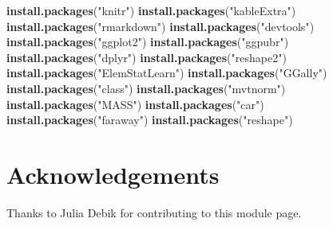 \documentclass[]{article}
\newenvironment{Shaded}{\begin{snugshade}}{\end{snugshade}}
\newcommand{\KeywordTok}[1]{\textcolor[rgb]{0.13,0.29,0.53}{\textbf{#1}}}
\newcommand{\NormalTok}[1]{#1}
\newcommand{\StringTok}[1]{\textcolor[rgb]{0.31,0.60,0.02}{#1}}
\begin{document}
\begin{Shaded}
\begin{Highlighting}[]
\KeywordTok{install.packages}\NormalTok{(}\StringTok{"knitr"}\NormalTok{)}
\KeywordTok{install.packages}\NormalTok{(}\StringTok{"kableExtra"}\NormalTok{)}
\KeywordTok{install.packages}\NormalTok{(}\StringTok{"rmarkdown"}\NormalTok{)}
\KeywordTok{install.packages}\NormalTok{(}\StringTok{"devtools"}\NormalTok{)}
\KeywordTok{install.packages}\NormalTok{(}\StringTok{"ggplot2"}\NormalTok{)}
\KeywordTok{install.packages}\NormalTok{(}\StringTok{"ggpubr"}\NormalTok{)}
\KeywordTok{install.packages}\NormalTok{(}\StringTok{"dplyr"}\NormalTok{)}
\KeywordTok{install.packages}\NormalTok{(}\StringTok{"reshape2"}\NormalTok{)}
\KeywordTok{install.packages}\NormalTok{(}\StringTok{"ElemStatLearn"}\NormalTok{)}
\KeywordTok{install.packages}\NormalTok{(}\StringTok{"GGally"}\NormalTok{)}
\KeywordTok{install.packages}\NormalTok{(}\StringTok{"class"}\NormalTok{)}
\KeywordTok{install.packages}\NormalTok{(}\StringTok{"mvtnorm"}\NormalTok{)}
\KeywordTok{install.packages}\NormalTok{(}\StringTok{"MASS"}\NormalTok{)}
\KeywordTok{install.packages}\NormalTok{(}\StringTok{"car"}\NormalTok{)}
\KeywordTok{install.packages}\NormalTok{(}\StringTok{"faraway"}\NormalTok{)}
\KeywordTok{install.packages}\NormalTok{(}\StringTok{"reshape"}\NormalTok{)}
\end{Highlighting}
\end{Shaded}

\hypertarget{acknowledgements}{%
\section{Acknowledgements}\label{acknowledgements}}

Thanks to Julia Debik for contributing to this module page.
\end{document}

